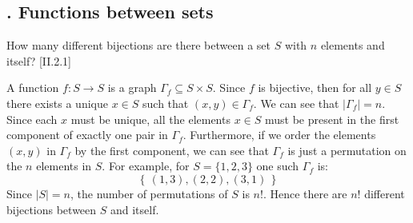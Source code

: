 \documentclass[12pt,letterpaper,boxed]{hmcpset}
\newcommand{\set}[1]{\left\{\,#1\,\right\}}
\newcommand{\abs}[1]{\left|#1\right|}
\begin{document}
\subsection{. Functions between sets}

\begin{problem}[2.1]
How many different bijections are there between a set $S$ with $n$ elements
and itself? [\textsection II.2.1]
\end{problem}
\begin{solution}
	A function $f:S\to S$ is a graph $\Gamma_f\subseteq S\times S$. Since $f$ is
	bijective, then for all $y\in S$ there exists a unique $x\in S$ such that
	$(x,y)\in\Gamma_f$. We can see that $\abs{\Gamma_f} = n$. Since each $x$ must be
	unique, all the elements $x\in S$ must be present in the first component of
	exactly one pair in $\Gamma_f$. Furthermore, if we order the elements $(x,y)$ in
	$\Gamma_f$ by the first component, we can see that $\Gamma_f$ is just a
	permutation on the $n$ elements in $S$. For example, for $S=\{1,2,3\}$ one such
	$\Gamma_f$ is:
	\[ \set{ (1,3), (2,2), (3,1) } \]
	Since $\abs{S} = n$, the number of permutations of $S$ is $n!$. Hence there are	$n!$ different bijections between $S$ and itself.
\end{solution}
\end{document}

